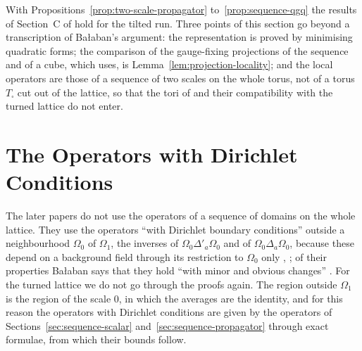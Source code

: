\documentclass[11pt]{preprint}
\numberwithin{equation}{section}
\theoremstyle{definition}
\theoremstyle{remark}
\theoremstyle{plain}
\begin{document}
With Propositions~\ref{prop:two-scale-propagator} to~\ref{prop:sequence-qgq} the results of Section~C of \cite{BalabanPRT2} hold for the tilted run. Three points of this section go beyond a transcription of Ba{\l}aban's argument: the representation \cite[(2.129)]{BalabanPRT2} is proved by minimising quadratic forms; the comparison of the gauge-fixing projections of the sequence and of a cube, which \cite[(2.134)]{BalabanPRT2} uses, is Lemma~\ref{lem:projection-locality}; and the local operators are those of a sequence of two scales on the whole torus, not of a torus $T_\square$ cut out of the lattice, so that the tori of \cite[p.~238]{BalabanPRT2} and their compatibility with the turned lattice do not enter.

\section{The Operators with Dirichlet Conditions}\label{sec:dirichlet}

The later papers do not use the operators of a sequence of domains on the whole lattice. They use the operators ``with Dirichlet boundary conditions'' outside a neighbourhood $\Omega_0$ of $\Omega_1$, the inverses of $\Omega_0\Delta'_a\Omega_0$ and of $\Omega_0\Delta_a\Omega_0$, because these depend on a background field through its restriction to $\Omega_0$ only \cite[p.~228]{BalabanPRT2}, \cite[pp.~393--395]{BalabanPBG}; of their properties Ba{\l}aban says that they hold ``with minor and obvious changes'' \cite[p.~228]{BalabanPRT2}. For the turned lattice we do not go through the proofs again. The region outside $\Omega_1$ is the region of the scale $0$, in which the averages are the identity, and for this reason the operators with Dirichlet conditions are given by the operators of Sections~\ref{sec:sequence-scalar} and~\ref{sec:sequence-propagator} through exact formulae, from which their bounds follow.
\end{document}
